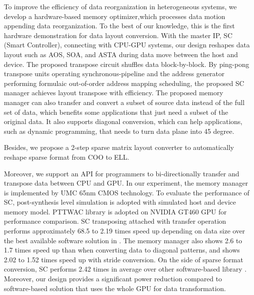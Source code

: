 \documentclass[10pt,journal,compsoc]{IEEEtran}
\begin{document}
To improve the efficiency of data reorganization in heterogeneous systems, we develop a hardware-based memory optimizer,which processes data motion appending data reorganization.
To the best of our knowledge, this is the first hardware demonstration
for data layout conversion.
With the master IP, SC (Smart Controller), connecting with CPU-GPU systems,
our design reshapes data layout such as AOS, SOA, and ASTA
during data move between the host and device.
The proposed transpose circuit shuffles data block-by-block. By ping-pong transpose units operating
synchronous-pipeline and the address generator performing
formulaic out-of-order address mapping scheduling, the proposed SC manager
achieves layout transpose with efficiency.
The proposed memory manager can also transfer and convert a subset of source data instead of the full set of data, which benefits some applications that just need a subset of the original data. It also supports diagonal conversion, which can help applications, such as dynamic programming, that needs to turn data plane into 45 degree.

Besides, we propose a 2-step sparse matrix layout converter to automatically reshape sparse format from COO to ELL.


Moreover, we support an API for programmers to bi-directionally
transfer and transpose data between CPU and GPU.
In our experiment, the memory manager is implemented
by UMC 65nm CMOS technology. To evaluate the performance of SC,
post-synthesis level simulation is adopted with simulated host
and device memory model. PTTWAC library \cite{ASTA} is adopted
on NVIDIA GT460 GPU for performance comparison.
SC transposing attached with transfer operation performs approximately
68.5 to 2.19 times speed up depending on data size
over the best available software solution in \cite{ASTA}.
The memory manager also shows 2.6 to 1.7 times speed up than \cite{Dymaxion} when converting data to diagonal patterns, and shows 2.02 to 1.52 times speed up with stride conversion.
On the side of sparse format conversion, SC performs
2.42 times in average over other software-based library \cite{Cusp}.
Moreover, our design
provides a significant power reduction compared to software-based
solution that uses the whole GPU for data transformation.


\end{document}
